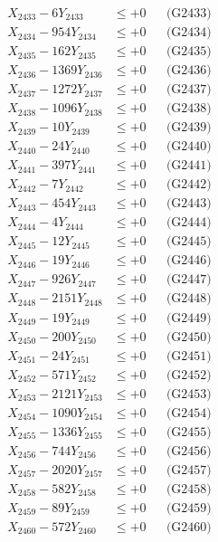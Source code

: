 \documentclass[a4paper,10pt]{article}
\begin{document}
{\begin{align}
X_{2433} - 6Y_{2433} &\leq +0 && \text{(G2433)} \\
X_{2434} - 954Y_{2434} &\leq +0 && \text{(G2434)} \\
X_{2435} - 162Y_{2435} &\leq +0 && \text{(G2435)} \\
X_{2436} - 1369Y_{2436} &\leq +0 && \text{(G2436)} \\
X_{2437} - 1272Y_{2437} &\leq +0 && \text{(G2437)} \\
X_{2438} - 1096Y_{2438} &\leq +0 && \text{(G2438)} \\
X_{2439} - 10Y_{2439} &\leq +0 && \text{(G2439)} \\
X_{2440} - 24Y_{2440} &\leq +0 && \text{(G2440)} \\
\allowbreak
X_{2441} - 397Y_{2441} &\leq +0 && \text{(G2441)} \\
X_{2442} - 7Y_{2442} &\leq +0 && \text{(G2442)} \\
X_{2443} - 454Y_{2443} &\leq +0 && \text{(G2443)} \\
X_{2444} - 4Y_{2444} &\leq +0 && \text{(G2444)} \\
X_{2445} - 12Y_{2445} &\leq +0 && \text{(G2445)} \\
X_{2446} - 19Y_{2446} &\leq +0 && \text{(G2446)} \\
X_{2447} - 926Y_{2447} &\leq +0 && \text{(G2447)} \\
X_{2448} - 2151Y_{2448} &\leq +0 && \text{(G2448)} \\
X_{2449} - 19Y_{2449} &\leq +0 && \text{(G2449)} \\
X_{2450} - 200Y_{2450} &\leq +0 && \text{(G2450)} \\
\allowbreak
X_{2451} - 24Y_{2451} &\leq +0 && \text{(G2451)} \\
X_{2452} - 571Y_{2452} &\leq +0 && \text{(G2452)} \\
X_{2453} - 2121Y_{2453} &\leq +0 && \text{(G2453)} \\
X_{2454} - 1090Y_{2454} &\leq +0 && \text{(G2454)} \\
X_{2455} - 1336Y_{2455} &\leq +0 && \text{(G2455)} \\
X_{2456} - 744Y_{2456} &\leq +0 && \text{(G2456)} \\
X_{2457} - 2020Y_{2457} &\leq +0 && \text{(G2457)} \\
X_{2458} - 582Y_{2458} &\leq +0 && \text{(G2458)} \\
X_{2459} - 89Y_{2459} &\leq +0 && \text{(G2459)} \\
X_{2460} - 572Y_{2460} &\leq +0 && \text{(G2460)} \\

\end{align}}
\end{document}
